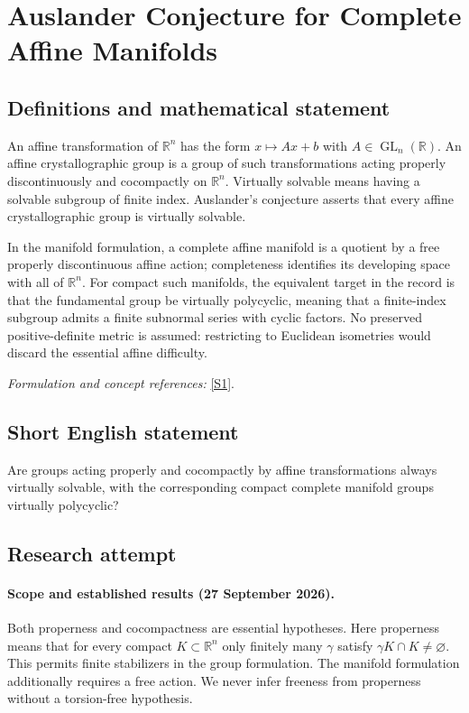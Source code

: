 \documentclass[11pt]{article}
\begin{document}
\section*{\texorpdfstring{Auslander Conjecture for Complete Affine Manifolds}{Auslander Conjecture for Complete Affine Manifolds}}\label{statement}
\subsection{Definitions and mathematical statement}
An affine transformation of ${\mathbb{R}}^n$ has the form $x\mapsto Ax+b$ with $A\in\operatorname{GL}_n({\mathbb{R}})$. An affine crystallographic group is a group of such transformations acting properly discontinuously and cocompactly on ${\mathbb{R}}^n$. Virtually solvable means having a solvable subgroup of finite index. Auslander's conjecture asserts that every affine crystallographic group is virtually solvable.

In the manifold formulation, a complete affine manifold is a quotient by a free properly discontinuous affine action; completeness identifies its developing space with all of ${\mathbb{R}}^n$. For compact such manifolds, the equivalent target in the record is that the fundamental group be virtually polycyclic, meaning that a finite-index subgroup admits a finite subnormal series with cyclic factors. No preserved positive-definite metric is assumed: restricting to Euclidean isometries would discard the essential affine difficulty.
\par\smallskip\textit{Formulation and concept references:} \href{https://www.math.umd.edu/~wmg/gstom.pdf}{[S1]}.

\subsection{Short English statement}
Are groups acting properly and cocompactly by affine transformations always virtually solvable, with the corresponding compact complete manifold groups virtually polycyclic?
\subsection{Research attempt}

\paragraph{Scope and established results (27 September 2026).}
Both properness and cocompactness are essential hypotheses. Here
properness means that for every compact $K\subset\mathbb R^n$ only
finitely many $\gamma$ satisfy $\gamma K\cap K\ne\varnothing$.
This permits finite stabilizers in the group formulation. The manifold
formulation additionally requires a free action. We never infer
freeness from properness without a torsion-free hypothesis.
\end{document}
